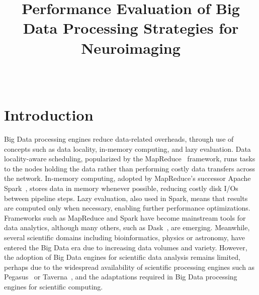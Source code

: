 \documentclass{IEEEtran}
\begin{document}
\title{Performance Evaluation of Big Data Processing Strategies for Neuroimaging}

\author{
  \\
}

\maketitle

\begin{abstract}
  
\end{abstract}


\section{Introduction} %

Big Data processing engines reduce data-related overheads, through 
use of concepts such as data locality, in-memory computing, and lazy evaluation.
Data locality-aware scheduling, popularized by the MapReduce~\cite{dean2008mapreduce} 
framework, runs tasks to the nodes holding the data rather than 
performing costly data transfers across the network. In-memory 
computing, adopted by MapReduce's successor Apache 
Spark~\cite{zaharia2016apache}, stores data in memory whenever 
possible, reducing costly disk I/Os between pipeline steps. 
Lazy evaluation, also used in Spark, means that results are computed only 
when necessary, enabling further performance optimizations. Frameworks 
such as
MapReduce and Spark have become mainstream tools for data analytics, 
although many others, such as 
Dask~\cite{rocklin2015dask}, are emerging. 
Meanwhile, several scientific 
domains including bioinformatics, physics or astronomy, have entered 
the Big Data era due to increasing data volumes and variety. 
However, the adoption of Big Data engines for scientific data analysis 
remains limited, perhaps due to the widespread availability of 
scientific processing engines such as Pegasus~\cite{deelman2005pegasus} or
Taverna~\cite{oinn2004taverna}, and the adaptations required in Big 
Data processing engines for scientific computing. 
\end{document}
